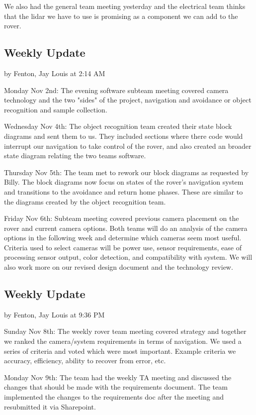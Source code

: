 \documentclass[10pt, oneside,onecolumn]{IEEEtran}
\begin{document}
We also had the general team meeting yesterday and the electrical team thinks that the lidar we have to use is promising as a component we can add to the rover.

\subsection{Weekly Update}
by Fenton, Jay Louis at 2:14 AM

Monday Nov 2nd: The evening software subteam meeting covered camera technology and the two "sides" of the project, navigation and avoidance or object recognition and sample collection. 

Wednesday Nov 4th: The object recognition team created their state block diagrams and sent them to us. They included sections where there code would interrupt our navigation to take control of the rover, and also created an broader state diagram relating the two teams software. 

Thursday Nov 5th: The team met to rework our block diagrams as requested by Billy. The block diagrams now focus on states of the rover's navigation system and transitions to the avoidance and return home phases. These are similar to the diagrams created by the object recognition team.

Friday Nov 6th: Subteam meeting covered previous camera placement on the rover and current camera options. Both teams will do an analysis of the camera options in the following week and determine which cameras seem most useful. Criteria used to select cameras will be power use, sensor requirements, ease of processing sensor output, color detection, and compatibility with system. We will also work more on our revised design document and the technology review. 

\subsection{Weekly Update}
by Fenton, Jay Louis at 9:36 PM

Sunday Nov 8th: The weekly rover team meeting covered strategy and together we ranked the camera/system requirements in terms of navigation. We used a series of criteria and voted which were most important. Example criteria we accuracy, efficiency, ability to recover from error, etc. 

Monday Nov 9th: The team had the weekly TA meeting and discussed the changes that should be made with the requirements document. The team implemented the changes to the requirements doc after the meeting and resubmitted it via Sharepoint.
\end{document}
